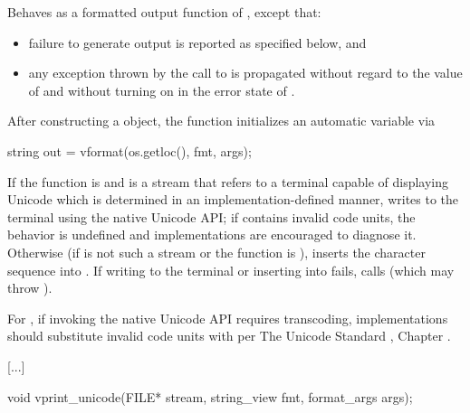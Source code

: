 \documentclass{wg21}
\begin{document}
\begin{itemdescr}
    \pnum
    \effects
    Behaves as a formatted output function
    of , except that:
    \begin{itemize}
        \item
        failure to generate output is reported as specified below, and
        \item
        any exception thrown by the call to  is propagated
        without regard to the value of  and
        without turning on  in the error state of .
    \end{itemize}
    After constructing a  object,
    the function initializes an automatic variable via
    \begin{codeblock}
        string out = vformat(os.getloc(), fmt, args);
    \end{codeblock}
    If the function is  and
     is a stream that refers to a terminal capable of displaying Unicode
    which is determined in an implementation-defined manner,
    writes  to the terminal using the native Unicode API;
    if  contains invalid code units,
    the behavior is undefined and
    implementations are encouraged to diagnose it.
    Otherwise (if  is not such a stream or
    the function is ),
    inserts the character sequence
     into .
    If writing to the terminal or inserting into  fails,
    calls 
    (which may throw ).

    \pnum
    \recommended
    For ,
    if invoking the native Unicode API requires transcoding,
    implementations should substitute invalid code units
    with  per
    The Unicode Standard , Chapter .
\end{itemdescr}

\textcolor{noteclr}{[...]}

%
\begin{itemdecl}
    void vprint_unicode(FILE* stream, string_view fmt, format_args args);
\end{itemdecl}
\end{document}

